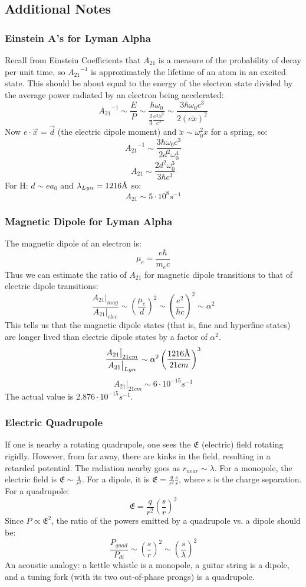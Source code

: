 \documentclass{article}
\def\lya{{Ly\alpha}}
\newcommand{\angstrom}{\mbox{\normalfont\AA}}
\def\wz{\omega_0}
\def\ato{{A_{21}}}
\def\eval#1{\big|_{#1}}
\def\eval#1{\big|_{#1}}
\def\wz{\omega_0}
\def\ato{{A_{21}}}
\def\e#1{\cdot10^{#1}}
\def\ato{{A_{21}}}
\begin{document}
\subsection{Additional Notes}

\subsubsection{ Einstein A's for Lyman Alpha}

Recall from Einstein Coefficients that $\ato$ is a measure of the probability of decay per unit time, so
$\ato^{-1}$ is approximately the lifetime of an atom in an excited state.  This should be about
equal to the energy of the electron state divided by the average power radiated
by an electron being accelerated:
$$\ato^{-1}\sim\frac{E}{ P}\sim\frac{\hbar\omega_0}{{\frac23}\frac{e^2\ddot x^2
}{c^3}}
\sim\frac{3\hbar\omega_0c^3}{2(e\ddot x)^2}$$
Now $e\cdot\vec x=\vec d$ (the electric dipole moment) and
$\ddot x\sim\omega_0^2x$ for a spring, so:
$$\ato^{-1}\sim\frac{3\hbar\wz c^3}{2d^2\wz^4}$$
$$\boxed{\ato\sim\frac{2d^2\wz^3}{3\hbar c^3}}$$
For H: 
$d\sim ea_0$ and $\lambda_\lya=1216\angstrom$ 
so:
$$\ato\sim5\e8s^{-1}$$

\subsubsection{ Magnetic Dipole for Lyman Alpha}

The magnetic dipole of an electron is:
$$\mu_e=\frac{e\hbar}{ m_ec}$$
Thus we can estimate the ratio of $\ato$ for magnetic dipole transitions to
that of electric dipole transitions:
$$\frac{\ato\eval{mag}}{\ato\eval{elec}}\sim\left(\frac{\mu_e}{ d}\right)^2
\sim\left(\frac{e^2}{\hbar c}\right)^2\sim\alpha^2$$
This tells us that the magnetic dipole states (that is, fine and hyperfine
states) are longer lived than electric dipole states by a factor of $\alpha^2$.
$$\frac{\ato\eval{21cm}}{\ato\eval{Ly\alpha}}\sim\alpha^2
\left(\frac{1216\angstrom}{21cm}\right)^3$$
$$\ato\eval{21cm}\sim6\e{-15}s^{-1}$$
The actual value is $2.876\e{-15}s^{-1}$.

\def\mfe{\mathfrak{E}}
\subsubsection{ Electric Quadrupole}

If one is nearby a rotating quadrupole, one sees the $\mfe$  (electric)
field rotating rigidly.
However, from far away, there are kinks in the field, resulting in a retarded
potential.  The radiation nearby goes as $r_{near}\sim\lambda$.  For a monopole,
the electric field is $\mfe\sim\frac{q}{ r^2}$.  For a dipole, it is 
$\mfe=\frac{q}{r^2}
\frac{s}{ r}$, where s is the charge separation.  For a quadrupole: 
$$\mfe=\frac{q}{ r^2}\left(\frac{s}{r}\right)^2$$
Since $P\propto \mfe^2$, the ratio of the powers emitted by a
quadrupole vs. a dipole should be:
$$\frac{P_{quad}}{ P_{di}}\sim\left(\frac{s}{ r}\right)^2
\sim\left(\frac{s}{\lambda}\right)^2$$
An acoustic analogy: a kettle whistle is a monopole, a
guitar string is a dipole, and a tuning fork (with its two out-of-phase
prongs) is a quadrupole.\\
\end{document}
